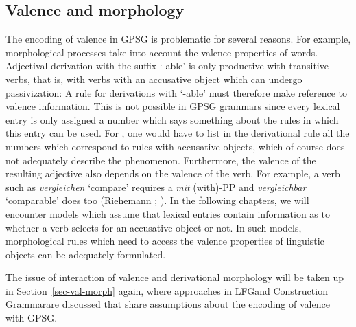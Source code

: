 \subsection{Valence and morphology}

The encoding of valence in GPSG is problematic for several reasons. For example, morphological processes take into account the valence properties of words. 
Adjectival derivation with the suffix  `-able' is only productive with transitive verbs,
that is, with verbs with an accusative object which can undergo passivization:
\eal\settowidth{}
\zl
A rule for derivations with  `-able' must therefore make reference to valence
information. This is not possible in GPSG grammars since every lexical entry is only assigned a
number which says something about the rules in which this entry can be used. For \bards, one would
have to list in the derivational rule all the numbers which correspond to rules with accusative
objects, which of course does not adequately describe the phenomenon. Furthermore, the valence of
the resulting adjective also depends on the valence of the verb. For example, a verb such as
\emph{vergleichen} `compare' requires a \emph{mit} (with)-PP and \emph{vergleichbar} `comparable'
does too (Riehemann \citeyear[, 54]{Riehemann93a}; \citeyear[]{Riehemann98a}).  In
the following chapters, we will encounter models which assume that lexical entries contain
information as to whether a verb selects for an accusative object or not. In such models,
morphological rules which need to access the valence properties of linguistic objects can be
adequately formulated.

The issue of interaction of valence and derivational morphology will be taken up in
Section~\ref{sec-val-morph} again, where approaches in LFG\indexlfg and Construction
Grammar\indexcxg are discussed that share assumptions about the encoding of valence with GPSG.

